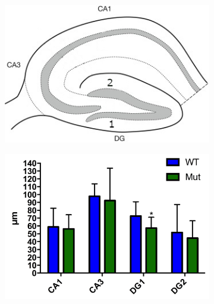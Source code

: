 \begin{figure}[h]
\begin{subfigure}[h]{0.329\textwidth}
		\end{subfigure}
		\begin{subfigure}[h]{0.329\textwidth}
			\caption{}
			\label{fig:hippIllu}
			\includegraphics[width=\textwidth]{./Images/HippSchema.jpg}
		\end{subfigure}
		\begin{subfigure}[h]{0.329\textwidth}
			\caption{}
			\label{fig:NeunQuantifNasal}
			\includegraphics[width=\textwidth]{./Images/Immuno/NeuN/Quantif_Nasal.jpg}
		\end{subfigure}
		\begin{subfigure}[h]{0.329\textwidth}
			\caption{}
			\label{fig:NeunQuantifMilieu}

\end{subfigure}
\end{figure}
